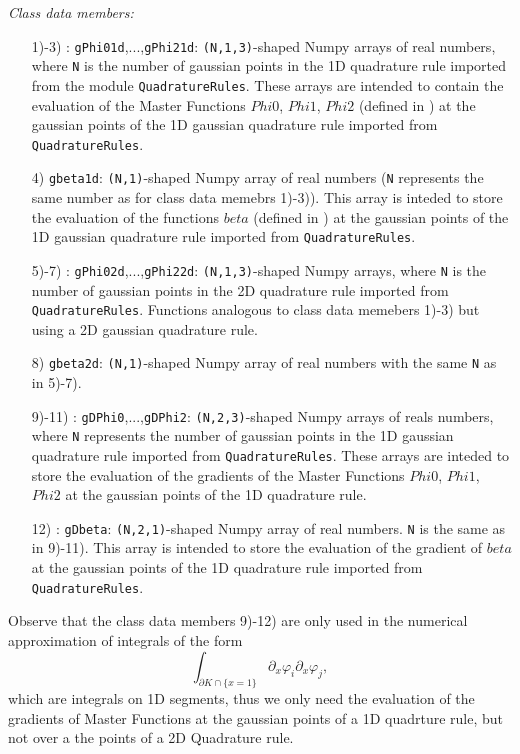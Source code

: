 \documentclass{amsart}
\theoremstyle{plain}
\theoremstyle{definition}
\theoremstyle{remark}
\numberwithin{equation}{section}
\begin{document}
\textit{Class data members:}
\begin{itemize}
\item[1)-3)]: \verb|gPhi01d|,...,\verb|gPhi21d|: \verb|(N,1,3)|-shaped Numpy arrays of real numbers, where \verb|N| is the number of gaussian points in the 1D quadrature rule imported from the module \verb|QuadratureRules|. These arrays are intended to contain the evaluation of the Master Functions $Phi0$, $Phi1$, $Phi2$ (defined in \cite{Meyer}) at the gaussian points of the 1D gaussian quadrature rule imported from \verb|QuadratureRules|.
\item[4)] \verb|gbeta1d|: \verb|(N,1)|-shaped Numpy array of real numbers (\verb|N| represents the same number as for class data memebrs 1)-3)).  This array is inteded to store the evaluation of the functions $beta$ (defined in \cite{Meyer}) at the gaussian points of the 1D gaussian quadrature rule imported from \verb|QuadratureRules|.

\item[5)-7)]: \verb|gPhi02d|,...,\verb|gPhi22d|: \verb|(N,1,3)|-shaped Numpy arrays, where \verb|N| is
the number of gaussian points in the 2D quadrature rule imported from \verb|QuadratureRules|. Functions analogous to class data memebers 1)-3) but using a 2D gaussian quadrature rule.
\item[8)] \verb|gbeta2d|: \verb|(N,1)|-shaped Numpy array of real numbers with the same \verb|N| as in 5)-7).

\item[9)-11)]: \verb|gDPhi0|,...,\verb|gDPhi2|: \verb|(N,2,3)|-shaped Numpy arrays of reals numbers, where \verb|N| represents the number of gaussian points in the 1D gaussian quadrature rule imported from \verb|QuadratureRules|. These arrays are inteded to store the evaluation of the gradients of the Master Functions $Phi0$, $Phi1$, $Phi2$ at the gaussian points of the 1D quadrature rule.

\item[12)]: \verb|gDbeta|: \verb|(N,2,1)|-shaped Numpy array of real numbers. \verb|N| is the same as in 9)-11). This array is intended to store the evaluation of the gradient of $beta$ at the gaussian points of the 1D quadrature rule imported from \verb|QuadratureRules|.
\end{itemize}
Observe that the class data members 9)-12) are only used in the numerical approximation of  integrals of the form
$$\int_{\partial K\cap\{x=1\}} \partial_x\varphi_i \partial_x\varphi_j,$$
which are integrals on 1D segments, thus we only need the evaluation of the gradients of Master Functions at the gaussian points of a 1D quadrture rule, but not over a the points of a 2D Quadrature rule.
\end{document}
